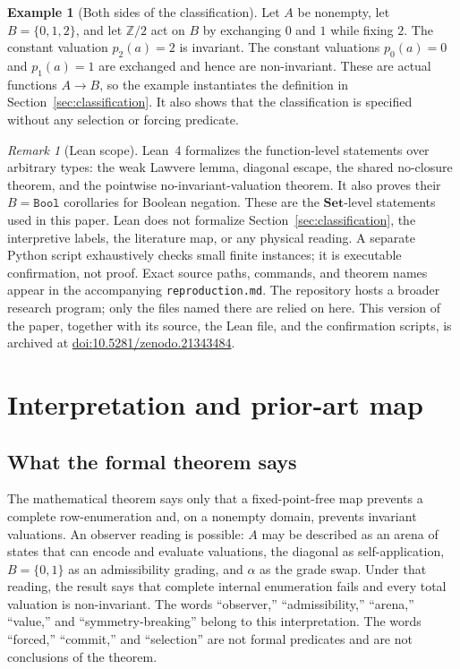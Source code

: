 \documentclass[11pt]{article}
\theoremstyle{definition}
\newtheorem{example}[theorem]{Example}
\theoremstyle{remark}
\newtheorem{remark}[theorem]{Remark}
\begin{document}
\begin{example}[Both sides of the classification]
\label{ex:classification}
Let $A$ be nonempty, let $B=\{0,1,2\}$, and let $\mathbb{Z}/2$ act on $B$ by exchanging $0$ and $1$ while fixing $2$. The constant valuation $p_2(a)=2$ is invariant. The constant valuations $p_0(a)=0$ and $p_1(a)=1$ are exchanged and hence are non-invariant. These are actual functions $A\to B$, so the example instantiates the definition in Section~\ref{sec:classification}. It also shows that the classification is specified without any selection or forcing predicate.
\end{example}

\begin{remark}[Lean scope]
\label{rem:machine}
Lean~4 formalizes the function-level statements over arbitrary types: the weak Lawvere lemma, diagonal escape, the shared no-closure theorem, and the pointwise no-invariant-valuation theorem. It also proves their $B=\texttt{Bool}$ corollaries for Boolean negation. These are the $\mathbf{Set}$-level statements used in this paper. Lean does not formalize Section~\ref{sec:classification}, the interpretive labels, the literature map, or any physical reading. A separate Python script exhaustively checks small finite instances; it is executable confirmation, not proof. Exact source paths, commands, and theorem names appear in the accompanying \texttt{reproduction.md}. The repository hosts a broader research program; only the files named there are relied on here. This version of the paper, together with its source, the Lean file, and the confirmation scripts, is archived at \href{https://doi.org/10.5281/zenodo.21343484}{doi:10.5281/zenodo.21343484}.
\end{remark}

\section{Interpretation and prior-art map}
\label{sec:novelty}

\subsection{What the formal theorem says}

The mathematical theorem says only that a fixed-point-free map prevents a complete row-enumeration and, on a nonempty domain, prevents invariant valuations. An observer reading is possible: $A$ may be described as an arena of states that can encode and evaluate valuations, the diagonal as self-application, $B=\{0,1\}$ as an admissibility grading, and $\alpha$ as the grade swap. Under that reading, the result says that complete internal enumeration fails and every total valuation is non-invariant. The words ``observer,'' ``admissibility,'' ``arena,'' ``value,'' and ``symmetry-breaking'' belong to this interpretation. The words ``forced,'' ``commit,'' and ``selection'' are not formal predicates and are not conclusions of the theorem.
\end{document}
